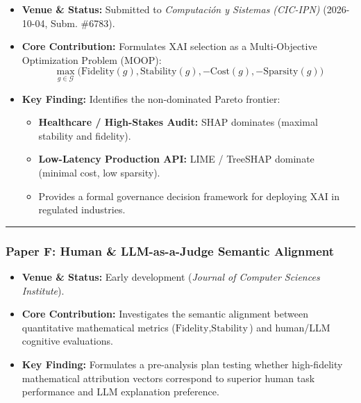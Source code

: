 \documentclass[
]{article}
\providecommand{\tightlist}{%
  \setlength{\itemsep}{0pt}\setlength{\parskip}{0pt}}
\begin{document}
\begin{itemize}
\tightlist
\item
  \textbf{Venue \& Status:} Submitted to \emph{Computación y Sistemas
  (CIC-IPN)} (2026-10-04, Subm. \#6783).
\item
  \textbf{Core Contribution:} Formulates XAI selection as a
  Multi-Objective Optimization Problem (MOOP):
  \[\max_{g \in \mathcal{G}} \Big( \text{Fidelity}(g), \text{Stability}(g), -\text{Cost}(g), -\text{Sparsity}(g) \Big)\]
\item
  \textbf{Key Finding:} Identifies the non-dominated Pareto frontier:

  \begin{itemize}
  \tightlist
  \item
    \textbf{Healthcare / High-Stakes Audit:} SHAP dominates (maximal
    stability and fidelity).
  \item
    \textbf{Low-Latency Production API:} LIME / TreeSHAP dominate
    (minimal cost, low sparsity).
  \item
    Provides a formal governance decision framework for deploying XAI in
    regulated industries.
  \end{itemize}
\end{itemize}

\begin{center}\rule{0.5\linewidth}{0.5pt}\end{center}

\subsubsection{Paper F: Human \& LLM-as-a-Judge Semantic
Alignment}\label{paper-f-human-llm-as-a-judge-semantic-alignment}

\begin{itemize}
\tightlist
\item
  \textbf{Venue \& Status:} Early development (\emph{Journal of Computer
  Sciences Institute}).
\item
  \textbf{Core Contribution:} Investigates the semantic alignment
  between quantitative mathematical metrics
  (\(\text{Fidelity}, \text{Stability}\)) and human/LLM cognitive
  evaluations.
\item
  \textbf{Key Finding:} Formulates a pre-analysis plan testing whether
  high-fidelity mathematical attribution vectors correspond to superior
  human task performance and LLM explanation preference.
\end{itemize}
\end{document}
